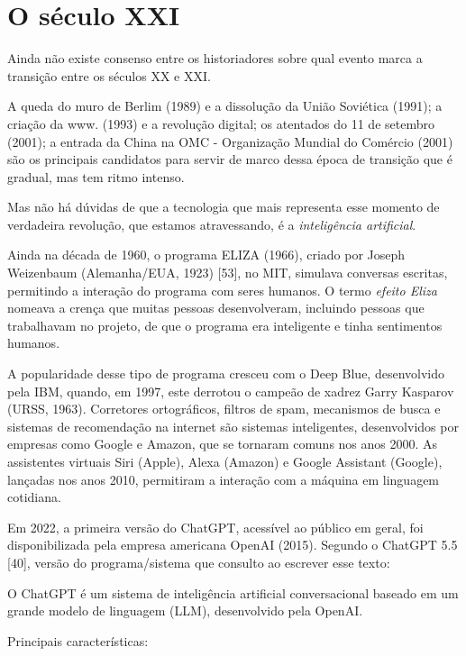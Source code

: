 \documentclass{hipatia}
\begin{document}
\section{O século XXI}

Ainda não existe consenso entre os historiadores sobre qual evento marca a transição entre os séculos XX e XXI.

	A queda do muro de Berlim (1989) e a dissolução da União Soviética (1991); a criação da www. (1993) e a revolução digital; os atentados do 11 de setembro (2001); a entrada da China na OMC - Organização Mundial do Comércio (2001) são os principais candidatos para servir de marco dessa época de transição que é gradual, mas tem ritmo intenso.

	Mas não há dúvidas de que a tecnologia que mais representa esse momento de verdadeira revolução, que estamos atravessando, é a \textit{inteligência artificial}.

	Ainda na década de 1960, o programa ELIZA (1966), criado por Joseph Weizenbaum (Alemanha/EUA, 1923) 	[53], no MIT, simulava conversas escritas, permitindo a interação do programa com seres humanos. O termo \textit{efeito Eliza} nomeava a crença que muitas pessoas desenvolveram, incluindo pessoas que trabalhavam no projeto, de que o programa era inteligente e tinha sentimentos humanos.

	A popularidade desse tipo de programa cresceu com o Deep Blue, desenvolvido pela IBM, quando, em 1997, este derrotou o campeão de xadrez Garry Kasparov (URSS, 1963). Corretores ortográficos, filtros de spam, mecanismos de busca e sistemas de recomendação na internet são sistemas inteligentes, desenvolvidos por empresas como Google e Amazon, que se tornaram comuns nos anos 2000. As assistentes virtuais Siri (Apple), Alexa (Amazon) e Google Assistant (Google), lançadas nos anos 2010, permitiram a interação com a máquina em linguagem cotidiana.

	Em 2022, a primeira versão do ChatGPT, acessível ao público em geral, foi disponibilizada pela empresa americana OpenAI (2015). Segundo o ChatGPT 5.5 [40], versão do programa/sistema que consulto ao escrever esse texto:

\vspace{0,3cm}

O ChatGPT é um sistema de inteligência artificial conversacional baseado em um grande modelo de linguagem (LLM), desenvolvido pela OpenAI.

Principais características:
\end{document}
